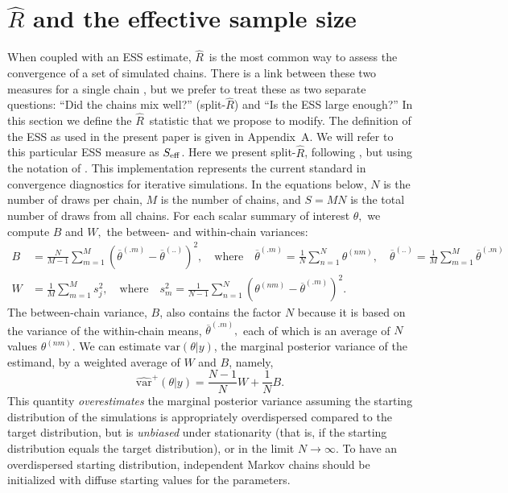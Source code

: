 \documentclass[american,]{article}
\newcommand{\Rhat}{$\widehat{R}$}
\newcommand{\sRhat}{split-$\widehat{R}$}
\theoremstyle{definition}
\begin{document}
\hypertarget{SplitRhat}{%
\section{$\widehat{R}$ and the effective sample size}\label{SplitRhat}}

When coupled with an ESS estimate,  \Rhat\ is the most common way to
assess the convergence of a set of simulated chains.  There is a link between
these two measures  for a single chain \citep{vats2018revisiting}, but we prefer to 
treat these as two separate questions: ``Did the chains mix well?'' (\sRhat) and 
``Is the ESS large enough?''  In this section we define the \Rhat\ 
statistic that we propose to modify. 
The definition of the ESS as used in the present paper is given in Appendix~A.
We will refer to this particular ESS measure as \(S_{\rm eff}\).
%
%
Here we present split-\(\widehat{R}\),
following \citet{BDA3}, but using the notation of
\citet{StanManual.2.18.0}. This implementation represents the current 
standard in convergence diagnostics for iterative simulations. In the
equations below, \(N\) is the number of draws per chain, \(M\) is the
number of chains, and \(S=MN\) is the total number of draws from all
chains. For each scalar summary of interest \(\theta,\) we compute \(B\)
and \(W,\) the between- and within-chain variances:
\begin{align}
B &= \frac{N}{M-1}\sum_{m=1}^{M}(\overline{\theta}^{(.m)} - 
\overline{\theta}^{(..)})^2, \quad \mbox{where} \quad 
\overline{\theta}^{(.m)}=\frac{1}{N}\sum_{n=1}^N \theta^{(nm)}, \quad
\overline{\theta}^{(..)} = \frac{1}{M}\sum_{m=1}^M\overline{\theta}^{(.m)} 
\\
W &= \frac{1}{M}\sum_{m=1}^{M}s_j^2, \quad \mbox{where} \quad
s_m^2=\frac{1}{N-1} \sum_{n=1}^N (\theta^{(nm)}-\overline{\theta}^{(.m)})^2.
\end{align}
The between-chain variance, \(B\), also contains the factor \(N\)
because it is based on the variance of the within-chain means,
\(\overline{\theta}^{(.m)},\) each of which is an average of \(N\)
values \(\theta^{(nm)}\). We can estimate \(\mbox{var}(\theta | y)\),
the marginal posterior variance of the estimand, by a weighted average
of \(W\) and \(B\), namely,
\begin{equation}
\widehat{\mbox{var}}^+(\theta| y) = \frac{N-1}{N}W + \frac{1}{N}B.
\end{equation}
This quantity \emph{overestimates} the marginal posterior variance
assuming the starting distribution of the simulations is appropriately
overdispersed compared to the target distribution, but is
\emph{unbiased} under stationarity (that is, if the starting
distribution equals the target distribution), or in the limit
\(N\rightarrow\infty\). To have an overdispersed starting distribution,
independent Markov chains should be initialized with diffuse starting
values for the parameters. 
\end{document}
